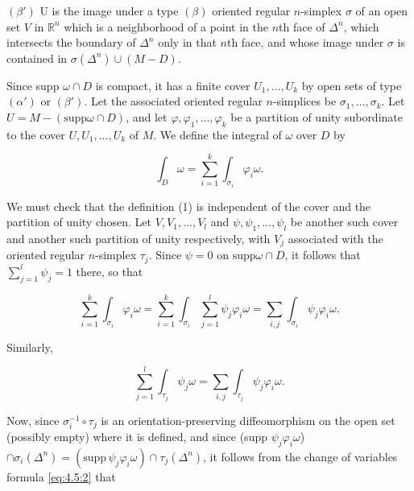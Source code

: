 $ (\beta') $ U is the image under a type  $ (\beta) $ oriented regular  $ n $-simplex  $ \sigma $ of an open set  $ V $ in  $ \mathbb{R}^n $ which is a neighborhood of a point in the  $ n $th face of  $ \Delta^n $, which intersects the boundary of  $ \Delta^n $ only in that  $ n $th face, and whose image under  $ \sigma $ is contained in  $ \sigma(\Delta^n) \cup (M - D) $.

\begin{center}
\end{center}

Since supp $\omega \cap D$ is compact, it has a finite cover $U_1, \ldots, U_k$ by open sets of type $(\alpha')$ or $(\beta')$. Let the associated oriented regular $n$-simplices be $\sigma_1, \ldots, \sigma_k$. Let $U = M - (\text{supp} \omega \cap D)$, and let $\varphi, \varphi_1, \ldots, \varphi_k$ be a partition of unity subordinate to the cover $U, U_1, \ldots, U_k$ of $M$. We define the integral of $\omega$ over $D$ by

\begin{equation}
\tag{1}\label{eq:4.8:1}
\int_{D}\omega=\sum_{i=1}^{k}\int_{\sigma_{i}}\varphi_{i}\omega.
\end{equation}

We must check that the definition (1) is independent of the cover and the partition of unity chosen. Let $V, V_{1}, \ldots, V_{l}$ and $\psi, \psi_{1}, \ldots, \psi_{l}$ be another such cover and another such partition of unity respectively, with $V_{j}$ associated with the oriented regular $n$-simplex $\tau_{j}$. Since $\psi = 0$ on $\mathrm{supp} \omega \cap D$, it follows that $\sum_{j=1}^{l}\psi_{j} = 1$ there, so that

\begin{equation}
\tag{2}\label{eq:4.8:2}
\sum_{i=1}^{k}\int_{\sigma_{i}}\varphi_{i}\omega=\sum_{i=1}^{k}\int_{\sigma_{i}}\sum_{j=1}^{l}\psi_{j}\varphi_{i}\omega=\sum_{i,j}\int_{\sigma_{i}}\psi_{j}\varphi_{i}\omega.
\end{equation}

Similarly,

\begin{equation}
\tag{3}\label{eq:4.8:3}
\sum_{j=1}^{l}\int_{\tau_{j}}\psi_{j}\omega=\sum_{i,j}\int_{\tau_{j}}\psi_{j}\varphi_{i}\omega.
\end{equation}

Now, since $\sigma_i^{-1}\circ\tau_j$ is an orientation-preserving diffeomorphism on the open set (possibly empty) where it is defined, and since (supp $\psi_j\varphi_i\omega$) $\cap\sigma_i(\Delta^n) = (\mathrm{supp}\,\psi_j\varphi_i\omega)\cap\tau_j(\Delta^n)$, it follows from the change of variables formula \eqref{eq:4.5:2} that

